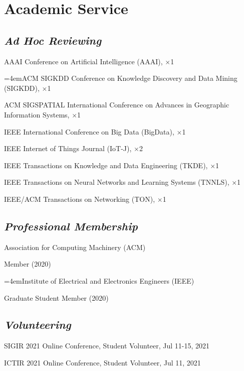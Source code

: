 
\vspace{-8pt}
\section*{Academic Service}
\vspace{-4pt}


\subsection*{\textnormal{\textit{Ad Hoc Reviewing}}}
\vspace{-4pt}
\indent

AAAI Conference on Artificial Intelligence (AAAI), $\times$1

\hangindent=4emACM SIGKDD Conference on Knowledge Discovery and Data Mining (SIGKDD), $\times$1

ACM SIGSPATIAL International Conference on Advances in Geographic Information Systems, $\times$1

IEEE International Conference on Big Data (BigData), $\times$1

IEEE Internet of Things Journal (IoT-J), $\times$2

IEEE Transactions on Knowledge and Data Engineering (TKDE), $\times$1

IEEE Transactions on Neural Networks and Learning Systems (TNNLS), $\times$1

IEEE/ACM Transactions on Networking (TON), $\times$1

\subsection*{\textnormal{\textit{Professional Membership}}}
\vspace{-4pt}
\indent 

Association for Computing Machinery (ACM)  

\hspace{2em}Member (2020)

\hangindent=4emInstitute of Electrical and Electronics Engineers (IEEE)

\hspace{2em}Graduate Student Member (2020)



\subsection*{\textnormal{\textit{Volunteering}}}
\vspace{-4pt}
\indent 

SIGIR 2021 Online Conference, Student Volunteer, Jul 11-15, 2021

ICTIR 2021 Online Conference, Student Volunteer, Jul 11, 2021